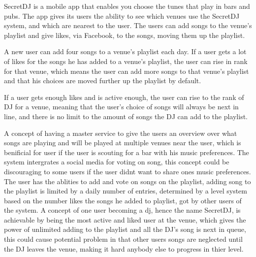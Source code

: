 SecretDJ \cite{secretDJ} is a mobile app that enables you choose the tunes that play in bars and pubs. The app gives its users the ability to see which venues use the SecretDJ system, and which are nearest to the user. The users can add songs to the venue's playlist and give likes, via Facebook, to the songs, moving them up the playlist.

A new user can add four songs to a venue's playlist each day. If a user gets a lot of likes for the songs he has added to a venue's playlist, the user can rise in rank for that venue, which means the user can add more songs to that venue's playlist and that his choices are moved further up the playlist by default.

If a user gets enough likes and is active enough, the user can rise to the rank of DJ for a venue, meaning that the user's choice of songs will always be next in line, and there is no limit to the amount of songs the DJ can add to the playlist.

A concept of having a master service to give the users an overview over what songs are playing and will be played at multiple venues near the user, which is benificial for user if the user is scouting for a bar with his music preferences. The system intergrates a social media for voting on song, this concept could be discouraging to some users if the user didnt want to share ones music preferences. The user has the ablities to add and vote on songs on the playlist, adding song to the playlist is limited by a daily number of entries, determined by a level system based on the number likes the songs he added to playlist, got by other users of the system. A concept of one user becoming a dj, hence the name SecretDJ, is achievable by being the most active and liked user at the venue, which gives the power of unlimited adding to the playlist and all the DJ's song is next in queue, this could cause potential problem in that other users songs are neglected until the DJ leaves the venue, making it hard anybody else to progress in thier level.
